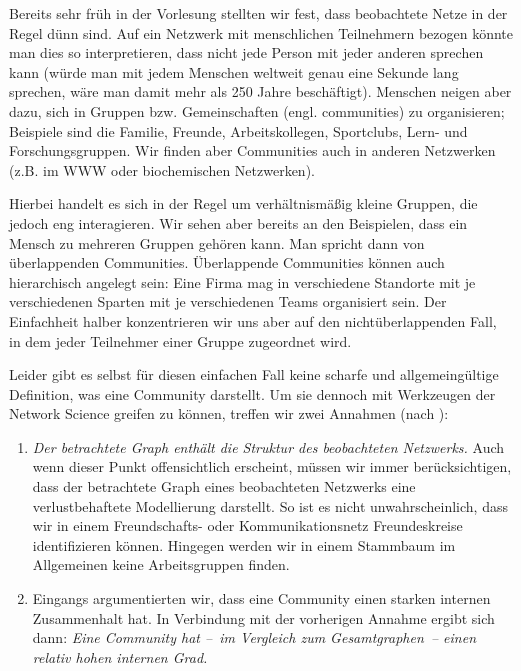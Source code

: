 Bereits sehr früh in der Vorlesung stellten wir fest, dass beobachtete Netze in der Regel dünn sind.
Auf ein Netzwerk mit menschlichen Teilnehmern bezogen könnte man dies so interpretieren, dass nicht jede Person mit jeder anderen sprechen kann (würde man mit jedem Menschen weltweit genau eine Sekunde lang sprechen, wäre man damit mehr als 250 Jahre beschäftigt).
Menschen neigen aber dazu, sich in Gruppen bzw. Gemeinschaften (engl. communities) zu organisieren;
Beispiele sind die Familie, Freunde, Arbeitskollegen, Sportclubs, Lern- und Forschungsgruppen.
Wir finden aber Communities auch in anderen Netzwerken (z.B. im WWW oder biochemischen Netzwerken).

Hierbei handelt es sich in der Regel um verhältnismäßig kleine Gruppen, die jedoch eng interagieren.
Wir sehen aber bereits an den Beispielen, dass ein Mensch zu mehreren Gruppen gehören kann.
Man spricht dann von überlappenden Communities.
Überlappende Communities können auch hierarchisch angelegt sein: Eine Firma mag in verschiedene Standorte mit je verschiedenen Sparten mit je verschiedenen Teams organisiert sein.
Der Einfachheit halber konzentrieren wir uns aber auf den nichtüberlappenden Fall, in dem jeder Teilnehmer einer Gruppe zugeordnet wird.

Leider gibt es selbst für diesen einfachen Fall keine scharfe und allgemeingültige Definition, was eine Community darstellt.
Um sie dennoch mit Werkzeugen der Network Science greifen zu können, treffen wir zwei Annahmen (nach \cite{barabasi2014network}):

\begin{enumerate}[label=H\arabic*), ref=H\arabic*]
    \item\label{enum:contains_structure}
          \emph{Der betrachtete Graph enthält die Struktur des beobachteten Netzwerks.}
          Auch wenn dieser Punkt offensichtlich erscheint, müssen wir immer berücksichtigen, dass der betrachtete Graph eines beobachteten Netzwerks eine verlustbehaftete Modellierung darstellt.
          So ist es nicht unwahrscheinlich, dass wir in einem Freundschafts- oder Kommunikationsnetz Freundeskreise identifizieren können.
          Hingegen werden wir in einem Stammbaum im Allgemeinen keine Arbeitsgruppen finden.

    \item\label{enum:high_internal_degree}
          Eingangs argumentierten wir, dass eine Community einen starken internen Zusammenhalt hat.
          In Verbindung mit der vorherigen Annahme ergibt sich dann:
          \emph{Eine Community hat --~im Vergleich zum Gesamtgraphen~-- einen relativ hohen internen Grad.}
\end{enumerate}

